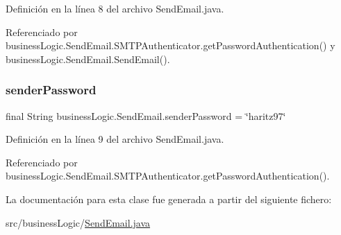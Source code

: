 Definición en la línea 8 del archivo Send\+Email.\+java.



Referenciado por business\+Logic.\+Send\+Email.\+S\+M\+T\+P\+Authenticator.\+get\+Password\+Authentication() y business\+Logic.\+Send\+Email.\+Send\+Email().

\mbox{\label{classbusiness_logic_1_1_send_email_a0bd45a69289e50c9439e70835c06ff0c}} 
\subsubsection{\texorpdfstring{senderPassword}{senderPassword}}
{\footnotesize\ttfamily final String business\+Logic.\+Send\+Email.\+sender\+Password = \char`\"{}haritz97\char`\"{}\hspace{0.3cm}{\ttfamily [package]}}



Definición en la línea 9 del archivo Send\+Email.\+java.



Referenciado por business\+Logic.\+Send\+Email.\+S\+M\+T\+P\+Authenticator.\+get\+Password\+Authentication().



La documentación para esta clase fue generada a partir del siguiente fichero\+:\begin{DoxyCompactItemize}
\item 
src/business\+Logic/\mbox{\hyperlink{_send_email_8java}{Send\+Email.\+java}}\end{DoxyCompactItemize}
